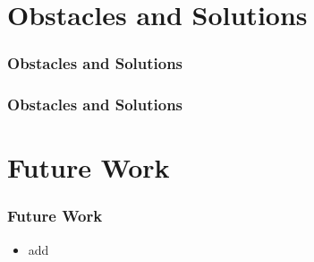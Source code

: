 \documentclass{beamer}
\begin{document}
\section{Obstacles and Solutions }
\begin{frame}
\frametitle{Obstacles and Solutions}

\end{frame}

\begin{frame}
\frametitle{Obstacles and Solutions}

\end{frame}

\section{Future Work}
\begin{frame}
\frametitle{Future Work}
\begin{itemize}
\item add
\end{itemize}
\end{frame}
\end{document}
